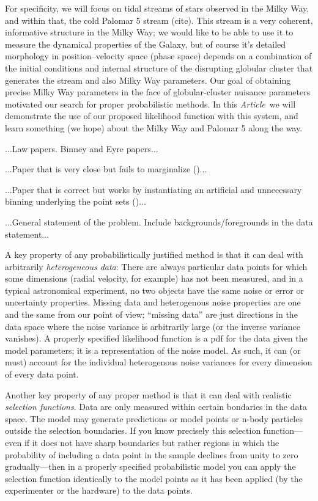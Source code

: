 \documentclass[12pt,pdftex,preprint]{aastex}
\newcommand{\documentname}{\textsl{Article}}
\begin{document}
For specificity, we will focus on tidal streams of stars observed in
the Milky Way, and within that, the cold Palomar 5 stream (cite).
This stream is a very coherent, informative structure in the Milky
Way; we would like to be able to use it to measure the dynamical
properties of the Galaxy, but of course it's detailed morphology in
position--velocity space (phase space) depends on a combination of the
initial conditions and internal structure of the disrupting globular
cluster that generates the stream and also Milky Way parameters.  Our
goal of obtaining precise Milky Way parameters in the face of
globular-cluster nuisance parameters motivated our search for proper
probabilistic methods.  In this \documentname\ we will demonstrate the
use of our proposed likelihood function with this system, and learn
something (we hope) about the Milky Way and Palomar 5 along the way.

...Law papers.  Binney and Eyre papers...

...Paper that is very close but fails to marginalize
(\citealt{varghese})...

...Paper that is correct but works by instantiating an artificial and
unnecessary binning underlying the point sets (\citealt{saha})...

...General statement of the problem.  Include backgrounds/foregrounds
in the data statement...

A key property of any probabilistically justified method is that it
can deal with arbitrarily \emph{heterogeneous data}:
There are always particular data points for which some dimensions
(radial velocity, for example) has not been measured, and in a typical
astronomical experiment, no two objects have the same noise or error
or uncertainty properties.
Missing data and heterogenous noise properties are one and the same
from our point of view; ``missing data'' are just directions in the
data space where the noise variance is arbitrarily large (or the
inverse variance vanishes).
A properly specified likelihood function is a pdf for the data given
the model parameters; it is a representation of the noise model.
As such, it can (or must) account for the individual heterogenous
noise variances for every dimension of every data point.

Another key property of any proper method is that it can deal with
realistic \emph{selection functions}.
Data are only measured within certain bondaries in the data space.
The model may generate predictions or model points or n-body
particles outside the selection boundaries.
If you know precisely this selection function---even if it does
not have sharp boundaries but rather regions in which the
probability of including a data point in the sample declines from
unity to zero gradually---then in a properly specified probabilistic
model you can apply the selection function identically to the model
points as it has been applied (by the experimenter or the hardware)
to the data points.
\end{document}
